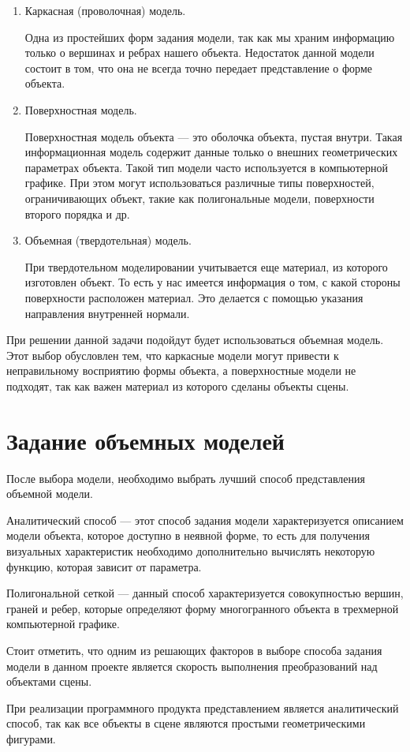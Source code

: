 \begin{enumerate}
	\item Каркасная (проволочная) модель.
	
	Одна из простейших форм задания модели, так как мы храним информацию только о вершинах и ребрах нашего объекта. Недостаток данной модели состоит в том, что она не всегда точно передает представление о форме объекта.
	
	\item Поверхностная модель.
	
	Поверхностная модель объекта --- это оболочка объекта, пустая внутри. Такая информационная модель содержит данные только о внешних геометрических параметрах объекта. Такой тип модели часто используется в компьютерной графике. При этом могут использоваться различные типы поверхностей, ограничивающих объект, такие как полигональные модели, поверхности второго порядка и др.
	
	\item  Объемная (твердотельная) модель.
	
	При твердотельном моделировании учитывается еще материал, из которого изготовлен объект. То есть у нас имеется информация о том, с какой стороны поверхности расположен материал. Это делается с помощью указания направления внутренней нормали.
	
\end{enumerate}

При решении данной задачи подойдут будет использоваться объемная модель. Этот выбор обусловлен тем, что каркасные модели могут привести к неправильному восприятию формы объекта, а поверхностные модели не подходят, так как важен материал из которого сделаны объекты сцены.

\section{Задание объемных моделей}

После выбора модели, необходимо выбрать лучший способ представления объемной модели.

Аналитический способ --- этот способ задания модели характеризуется описанием модели объекта, которое доступно в неявной форме, то есть для получения визуальных характеристик необходимо дополнительно вычислять некоторую функцию, которая зависит от параметра.

Полигональной сеткой --- данный способ характеризуется совокупностью вершин, граней и ребер, которые определяют форму многогранного объекта в трехмерной компьютерной графике.

Стоит отметить, что одним из решающих факторов в выборе способа задания модели в данном проекте является скорость выполнения преобразований над объектами сцены.

При реализации программного продукта представлением является аналитический способ, так как все объекты в сцене являются простыми геометрическими фигурами.

